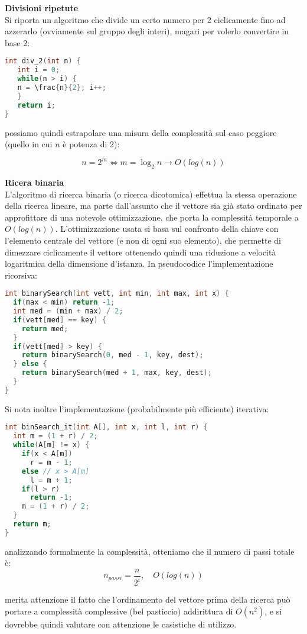 \documentclass[a4paper,12pt]{article}
\begin{document}
\textbf{Divisioni ripetute} \\
Si riporta un algoritmo che divide un certo numero per 2 ciclicamente fino ad azzerarlo (ovviamente sul gruppo degli
interi), magari per volerlo convertire in base 2:
\begin{lstlisting}[language=C++]
int div_2(int n) {
   int i = 0;
   while(n > i) {
   n = \frac{n}{2}; i++;
   }
   return i;
}
\end{lstlisting}

possiamo quindi estrapolare una misura della complessità sul caso peggiore (quello in cui $n$ è potenza di 2):

$$ n = 2^m \Leftrightarrow m = \log_2{n} \rightarrow O(log(n)) $$

\textbf{Ricera binaria} \\
L'algoritmo di ricerca binaria (o ricerca dicotomica) effettua la stessa operazione della ricerca lineare, ma
parte dall'assunto che il vettore sia già stato ordinato per approfittare di una notevole ottimizzazione, che porta la complessità
temporale a $O(log(n))$. L'ottimizzazione usata si basa sul confronto della chiave con l'elemento centrale del vettore
(e non di ogni suo elemento), che permette di dimezzare ciclicamente il vettore ottenendo quindi una riduzione
a velocità logaritmica della dimensione d'istanza. In pseudocodice l'implementazione ricorsiva:

\begin{lstlisting}[language=C++]
int binarySearch(int vett, int min, int max, int x) {
  if(max < min) return -1;
  int med = (min + max) / 2;
  if(vett[med] == key) {
    return med;
  }
  if(vett[med] > key) {
    return binarySearch(0, med - 1, key, dest);
  } else {
    return binarySearch(med + 1, max, key, dest);
  }
}
\end{lstlisting}

Si nota inoltre l'implementazione (probabilmente più efficiente) iterativa:
\begin{lstlisting}[language=C++]
int binSearch_it(int A[], int x, int l, int r) {
  int m = (1 + r) / 2;
  while(A[m] != x) {
    if(x < A[m])
      r = m - 1;
    else // x > A[m]
      l = m + 1;
    if(l > r)
      return -1;
    m = (1 + r) / 2;
  }
  return m;
}
\end{lstlisting}

analizzando formalmente la complessità, otteniamo che il numero di passi totale è:
$$ n_{passi} = \frac{n}{2^i}, \quad O(log(n)) $$

merita attenzione il fatto che l'ordinamento del vettore prima della ricerca può portare a complessità
complessive (bel pasticcio) addirittura di $O(n^2)$, e si dovrebbe quindi valutare con attenzione le casistiche
di utilizzo.
\end{document}
